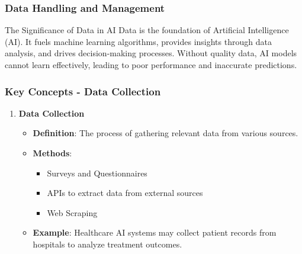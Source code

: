 \documentclass[aspectratio=169]{beamer}
\begin{document}
\begin{frame}
    \frametitle{Data Handling and Management}
    \begin{block}{The Significance of Data in AI}
        Data is the foundation of Artificial Intelligence (AI). It fuels machine learning algorithms, provides insights through data analysis, and drives decision-making processes. Without quality data, AI models cannot learn effectively, leading to poor performance and inaccurate predictions.
    \end{block}
\end{frame}

\begin{frame}
    \frametitle{Key Concepts - Data Collection}
    \begin{enumerate}
        \item \textbf{Data Collection}
            \begin{itemize}
                \item \textbf{Definition}: The process of gathering relevant data from various sources.
                \item \textbf{Methods}:
                    \begin{itemize}
                        \item Surveys and Questionnaires
                        \item APIs to extract data from external sources
                        \item Web Scraping
                    \end{itemize}
                \item \textbf{Example}: Healthcare AI systems may collect patient records from hospitals to analyze treatment outcomes.
            \end{itemize}
    \end{enumerate}
\end{frame}
\end{document}
